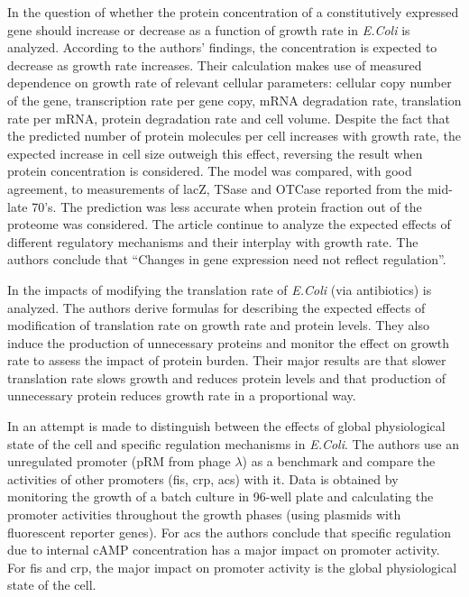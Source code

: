 \documentclass[a4page,notitlepage]{article}
\begin{document}
In \cite{Klumpp2009a} the question of whether the protein concentration of a constitutively expressed gene should increase or decrease as a function of growth rate in \emph{E.Coli} is analyzed.
According to the authors' findings, the concentration is expected to decrease as growth rate increases.
Their calculation makes use of measured dependence on growth rate of relevant cellular parameters: cellular copy number of the gene, transcription rate per gene copy, mRNA degradation rate, translation rate per mRNA, protein degradation rate and cell volume.
Despite the fact that the predicted number of protein molecules per cell increases with growth rate, the expected increase in cell size outweigh this effect, reversing the result when protein concentration is considered.
The model was compared, with good agreement, to measurements of lacZ, TSase and OTCase reported from the mid-late 70's.
The prediction was less accurate when protein fraction out of the proteome was considered.
The article continue to analyze the expected effects of different regulatory mechanisms and their interplay with growth rate.
The authors conclude that ``Changes in gene expression need not reflect regulation''.

In \cite{Scott2010b} the impacts of modifying the translation rate of \emph{E.Coli} (via antibiotics) is analyzed.
The authors derive formulas for describing the expected effects of modification of translation rate on growth rate and protein levels.
They also induce the production of unnecessary proteins and monitor the effect on growth rate to assess the impact of protein burden.
Their major results are that slower translation rate slows growth and reduces protein levels and that production of unnecessary protein reduces growth rate in a proportional way.

In \cite{Berthoumieux2013} an attempt is made to distinguish between the effects of global physiological state of the cell and specific regulation mechanisms in \emph{E.Coli}.
The authors use an unregulated promoter (pRM from phage $\lambda$) as a benchmark and compare the activities of other promoters (fis, crp, acs) with it.
Data is obtained by monitoring the growth of a batch culture in 96-well plate and calculating the promoter activities throughout the growth phases (using plasmids with fluorescent reporter genes).
For acs the authors conclude that specific regulation due to internal cAMP concentration has a major impact on promoter activity.
For fis and crp, the major impact on promoter activity is the global physiological state of the cell.
\end{document}
